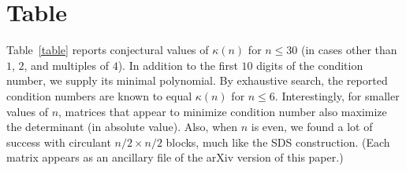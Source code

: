 \documentclass[11pt]{article}
\theoremstyle{plain}
\theoremstyle{definition}
\begin{document}
\appendix

\section{Table}

Table~\ref{table} reports conjectural values of $\kappa(n)$ for $n\leq 30$ (in cases other than $1$, $2$, and multiples of $4$).
In addition to the first $10$ digits of the condition number, we supply its minimal polynomial.
By exhaustive search, the reported condition numbers are known to equal $\kappa(n)$ for $n\leq 6$.
Interestingly, for smaller values of $n$, matrices that appear to minimize condition number also maximize the determinant (in absolute value).
Also, when $n$ is even, we found a lot of success with circulant $n/2\times n/2$ blocks, much like the SDS construction.
(Each matrix appears as an ancillary file of the arXiv version of this paper.)
\end{document}
